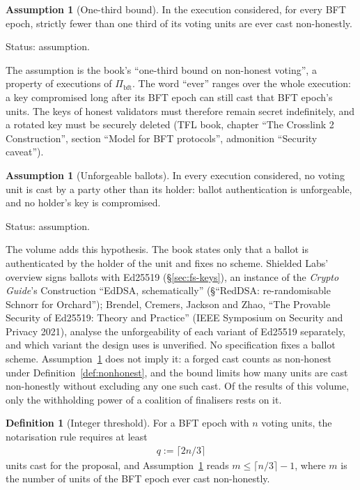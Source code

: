 \documentclass[11pt,a4paper]{article}
\theoremstyle{definition}
\newtheorem{definition}[theorem]{Definition}
\newtheorem{assumption}[theorem]{Assumption}
\newcommand{\bft}{\mathrm{bft}}
\newcommand{\Pibft}{\Pi_{\bft}}
\begin{document}
\begin{assumption}[One-third bound]\label{ass:one-third}
In the execution considered, for every BFT epoch, strictly fewer than one
third of its voting units are ever cast non-honestly.

Status: assumption.
\end{assumption}

The assumption is the book's ``one-third bound on non-honest voting'', a
property of executions of $\Pibft$. The word ``ever'' ranges over the whole
execution: a key compromised long after its BFT epoch can still cast that
BFT epoch's units. The keys of honest validators must therefore remain secret
indefinitely, and a rotated key must be securely deleted (TFL book, chapter
``The Crosslink 2 Construction'', section ``Model for BFT protocols'',
admonition ``Security caveat'').

\begin{assumption}[Unforgeable ballots]\label{ass:ballots}
In every execution considered, no voting unit is cast by a party other than
its holder: ballot authentication is unforgeable, and no holder's key is
compromised.

Status: assumption.
\end{assumption}

The volume adds this hypothesis. The book states only that a ballot is
authenticated by the holder of the unit and fixes no scheme. Shielded Labs'
overview signs ballots with Ed25519 (\S\ref{sec:fs-keys}), an instance of
the \emph{Crypto Guide}'s Construction ``EdDSA, schematically''
(\S``RedDSA: re-randomisable Schnorr for Orchard''); Brendel, Cremers,
Jackson and Zhao, ``The Provable Security of Ed25519: Theory and Practice''
(IEEE Symposium on Security and Privacy 2021), analyse the unforgeability of
each variant of Ed25519 separately, and which variant the design uses is
unverified. No specification fixes a ballot scheme.
Assumption~\ref{ass:one-third} does not imply it: a forged cast
counts as non-honest under Definition~\ref{def:nonhonest}, and the bound
limits how many units are cast non-honestly without excluding any one such
cast. Of the results of this volume, only the withholding power of a
coalition of finalisers rests on it.

\begin{definition}[Integer threshold]\label{def:quorum}
For a BFT epoch with $n$ voting units, the notarisation rule requires at
least
\begin{gather*}
  q := \lceil 2n/3 \rceil
\end{gather*}
units cast for the proposal, and Assumption~\ref{ass:one-third} reads
$m \le \lceil n/3 \rceil - 1$, where $m$ is the number of units of the BFT
epoch ever cast non-honestly.
\end{definition}
\end{document}

